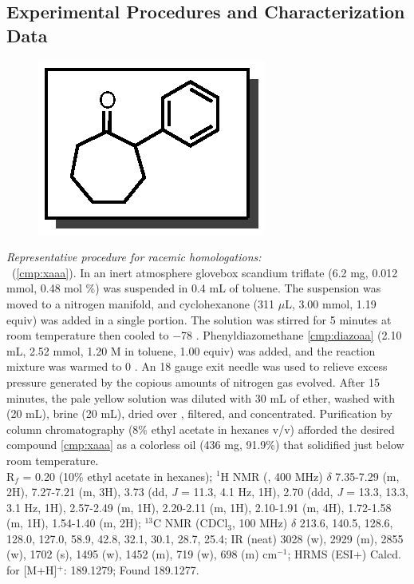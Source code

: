 \subsection{Experimental Procedures and Characterization Data}
\begin{figure}
  \vspace{-25pt}
  \begin{center}
    \includegraphics[scale=0.8]{chp_asymmetric/images/xaaa}
  \end{center}
  \vspace{-30pt}
\end{figure}
\textit{Representative procedure for racemic homologations:} \\ 
\textbf{\CMPxaaa}\ (\ref{cmp:xaaa}). In an inert atmosphere glovebox scandium triflate (6.2 mg,
0.012 mmol, 0.48 mol \%) was suspended in 0.4 mL of toluene. The suspension was moved to a nitrogen
manifold, and cyclohexanone (311 $\mu$L, 3.00 mmol, 1.19 equiv) was added in a single portion. The solution was stirred for 5 minutes at room temperature then cooled
to $-$78 \degc. Phenyldiazomethane \ref{cmp:diazoaa} (2.10 mL, 2.52 mmol, 1.20 M
in toluene, 1.00 equiv) was added, and the reaction mixture was warmed to 0 \degc. An 18
gauge exit needle was used to relieve excess pressure generated by the copious amounts of
nitrogen gas evolved. After 15 minutes, the pale yellow solution was diluted
with 30 mL of ether, washed with  (20 mL), brine (20 mL), dried over
, filtered, and concentrated. Purification by column chromatography
(8\% ethyl acetate in hexanes v/v) afforded the desired compound \ref{cmp:xaaa} as a
colorless oil (436 mg, 91.9\%) that solidified just below room temperature.\\
R$_f$ = 0.20 (10\% ethyl acetate in hexanes); 
$^1$H NMR (, 400 MHz) $\delta$ 7.35-7.29 (m, 2H), 7.27-7.21 (m, 3H),
3.73 (dd, \textit{J} =  11.3, 4.1 Hz, 1H), 2.70 (ddd, \textit{J} =  13.3, 13.3, 3.1 Hz, 1H), 2.57-2.49 (m, 1H), 2.20-2.11 (m, 1H), 2.10-1.91 (m, 4H), 1.72-1.58 (m, 1H), 1.54-1.40 (m, 2H); 
$^{13}$C NMR (CDCl$_3$, 100 MHz) $\delta$ 213.6, 140.5, 128.6, 128.0, 127.0,
58.9, 42.8, 32.1, 30.1, 28.7, 25.4; IR (neat) 3028 (w), 2929 (m), 2855 (w), 1702 (s),
1495 (w), 1452 (m), 719 (w), 698 (m) cm$^{-1}$; HRMS (ESI+) Calcd. for
 [M+H]$^+$: 189.1279; Found 189.1277.

